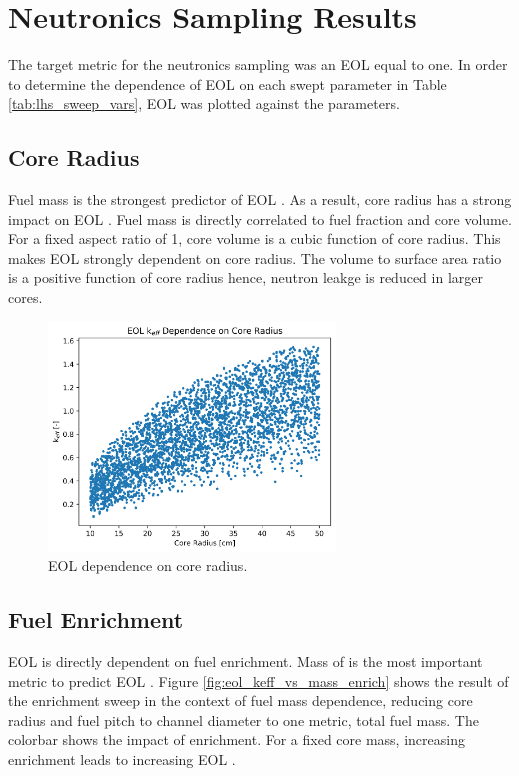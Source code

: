 \section{Neutronics Sampling Results}
The target metric for the neutronics sampling was an EOL \keff equal to one. In
order to determine the dependence of EOL \keff on each swept parameter in Table
\ref{tab:lhs_sweep_vars}, EOL \keff was plotted against the parameters.

\subsection{Core Radius}
Fuel mass is the strongest predictor of EOL \keff. As a result, core radius has a strong impact on EOL \keff. Fuel mass is directly correlated
to fuel fraction and core volume. For a fixed aspect ratio of 1, core volume is
a cubic function of core radius. This makes EOL \keff strongly dependent on core
radius. The volume to surface area ratio is a positive function of core radius
hence, neutron leakge is reduced in larger cores. 

\begin{figure}[h]
    \centering
    \includegraphics[width=3in]{../images/keff_vs_core_r.png}
\caption{EOL \keff dependence on core radius.}
\label{fig:eol_keff_vs_r_core}
\end{figure}

\subsection{Fuel Enrichment}
EOL \keff is directly dependent on fuel enrichment. Mass of \uran is the most
important metric to predict EOL \keff. Figure
\ref{fig:eol_keff_vs_mass_enrich} shows the result of the enrichment sweep in the context of
fuel mass dependence, reducing core radius and fuel pitch to channel diameter to
one metric, total fuel mass. The colorbar shows the impact of enrichment. For a fixed core
mass, increasing enrichment leads to increasing EOL \keff. 

